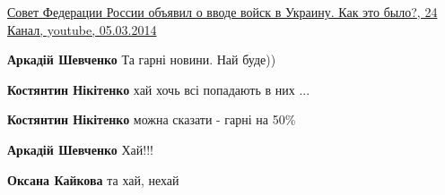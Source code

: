 \begin{itemize}
\href{https://www.youtube.com/watch?app=desktop&v=Mmep0Y7YiC4}{%
Совет Федерации России объявил о вводе войск в Украину. Как это было?, 24 Канал, youtube, 05.03.2014%
}

\begin{itemize}
 
\textbf{Аркадій Шевченко} Та гарні новини. Най буде))

\begin{itemize}
 
\textbf{Костянтин Нікітенко} хай хочь всі попадають в них ...

 
\textbf{Костянтин Нікітенко} можна сказати - гарні на 50\%

 
\textbf{Аркадій Шевченко} Хай!!!

 
\textbf{Оксана Кайкова} та хай, нехай \Smiley[1.0][yellow]
\end{itemize}

 

\end{itemize}
\end{itemize}
